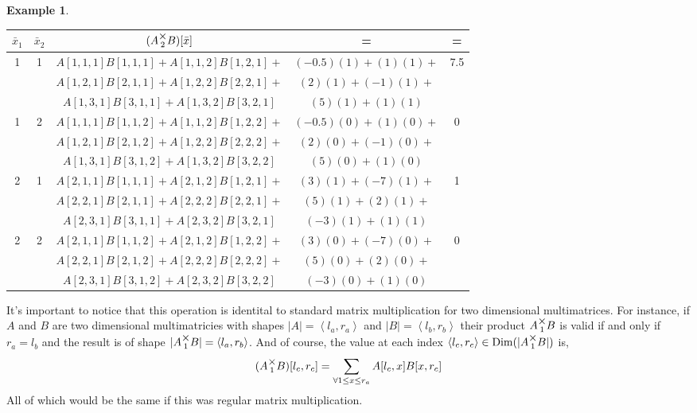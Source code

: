 \documentclass[12pt]{book}
\theoremstyle{plain}
\theoremstyle{definition}
\newtheorem{example}{Example}[chapter]
\theoremstyle{ppart}
\theoremstyle{case}
\theoremstyle{solution}
\DeclareMathOperator{\Dim}{Dim}
\newcommand{\mmult}[1]{\text{\raisebox{1ex}{$\underset{#1}{\times}$}}}
\begin{document}
\begin{example}
\begin{table}[h!]
\begin{center}
\begin{tabular}{c c | c | c | c}
$\bar{x}_1$ & $\bar{x}_2$ & $(A \mmult{2} B)[\bar{x}]$ & = & = \\
\hline
1 & 1 &
  $A[1,1,1]B[1,1,1] + A[1,1,2]B[1,2,1] +$ & $(-0.5)(1) + (1)(1) +$ & 7.5 \\
&&$A[1,2,1]B[2,1,1] + A[1,2,2]B[2,2,1] +$ & $(2)(1) + (-1)(1) +$ & \\
&&$A[1,3,1]B[3,1,1] + A[1,3,2]B[3,2,1]$   & $(5)(1) + (1)(1)$ & \\
1 & 2 &
  $A[1,1,1]B[1,1,2] + A[1,1,2]B[1,2,2] +$ & $(-0.5)(0) + (1)(0) +$ & 0 \\
&&$A[1,2,1]B[2,1,2] + A[1,2,2]B[2,2,2] +$ & $(2)(0) + (-1)(0) +$ & \\
&&$A[1,3,1]B[3,1,2] + A[1,3,2]B[3,2,2]$   & $(5)(0) + (1)(0)$ & \\
2 & 1 &
  $A[2,1,1]B[1,1,1] + A[2,1,2]B[1,2,1] +$ & $(3)(1) + (-7)(1) +$ & 1 \\
&&$A[2,2,1]B[2,1,1] + A[2,2,2]B[2,2,1] +$ & $(5)(1) + (2)(1) +$ & \\
&&$A[2,3,1]B[3,1,1] + A[2,3,2]B[3,2,1]$   & $(-3)(1) + (1)(1)$ & \\
2 & 2 &
  $A[2,1,1]B[1,1,2] + A[2,1,2]B[1,2,2] +$ & $(3)(0) + (-7)(0) +$ & 0 \\
&&$A[2,2,1]B[2,1,2] + A[2,2,2]B[2,2,2] +$ & $(5)(0) + (2)(0) +$ & \\
&&$A[2,3,1]B[3,1,2] + A[2,3,2]B[3,2,2]$   & $(-3)(0) + (1)(0)$ &
\end{tabular}
\end{center}
\end{table}

\end{example}
\newpage

It's important to notice that this operation is identital to standard
matrix multiplication for two dimensional multimatrices. For instance,
if $A$ and $B$ are two dimensional multimatricies with shapes
$|A| = \left<l_a, r_a\right>$ and $|B| = \left<l_b, r_b\right>$
their product $A \mmult{1} B$ is valid if and only if $r_a = l_b$ and
the result is of shape $|A \mmult{1} B| = \left<l_a, r_b\right>$.
And of course, the value at each index
$\left<l_c, r_c\right> \in \Dim(|A \mmult{1} B|)$ is,
\[
  (A \mmult{1} B)[l_c, r_c]
  =
  \sum_{\forall 1 \le x \le r_a} 
  A[l_c, x] B[x, r_c]
\]
All of which would be the same if this was regular matrix multiplication.
\end{document}

